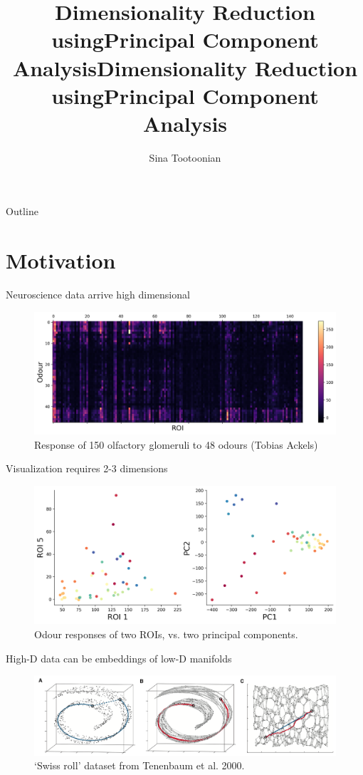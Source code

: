 \documentclass[presentation,smaller]{beamer}
\author{Sina Tootoonian}
\date{}
\title{Dimensionality Reduction using\newline Principal Component Analysis}
\title[Dimensionality Reduction using PCA]{Dimensionality Reduction using\newline Principal Component Analysis}
\begin{document}
\maketitle
\begin{frame}{Outline}
\tableofcontents
\end{frame}

\section{Motivation}
\label{sec:org14c7e8b}
\begin{frame}[label={sec:org4c7cf05}]{Neuroscience data arrive high dimensional}
\begin{figure}[htbp]
\centering
\includegraphics[width=1.0\textwidth]{figures/heatmap.png}
\caption{Response of 150 olfactory glomeruli to 48 odours (Tobias Ackels)}
\end{figure}
\end{frame}
\begin{frame}[label={sec:org2f4f994}]{Visualization requires 2-3 dimensions}
\begin{figure}[htbp]
\centering
\includegraphics[width=1.0\textwidth]{figures/PCA.png}
\caption{Odour responses of two ROIs, vs. two principal components.}
\end{figure}
\end{frame}
\begin{frame}[label={sec:org1f8b705}]{High-D data can be embeddings of low-D manifolds}
\begin{figure}[htbp]
\centering
\includegraphics[width=1.0\textwidth]{figures/swiss_roll.png}
\caption{`Swiss roll' dataset from Tenenbaum et al. 2000.}
\end{figure}
\end{frame}
\end{document}
